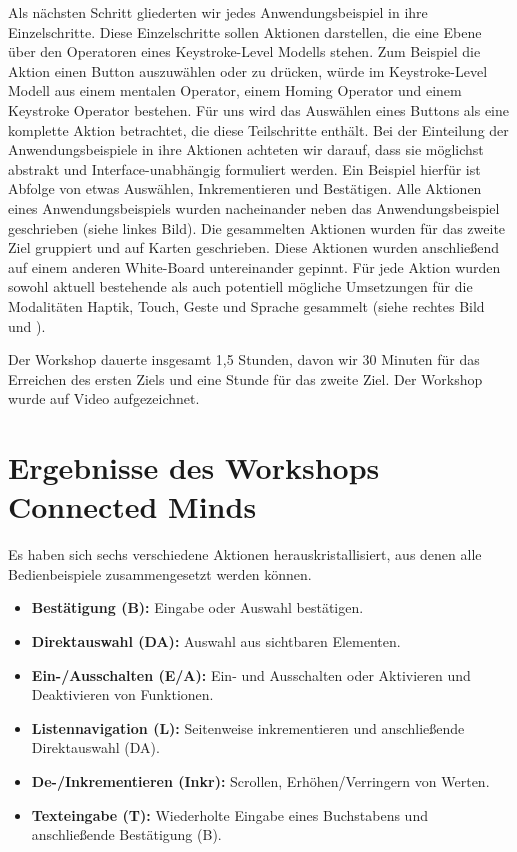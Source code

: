 Als nächsten Schritt gliederten wir jedes Anwendungsbeispiel in ihre Einzelschritte. 
Diese Einzelschritte sollen Aktionen darstellen, die eine Ebene über den Operatoren eines Keystroke-Level Modells stehen. 
Zum Beispiel die Aktion einen Button auszuwählen oder zu drücken, würde im Keystroke-Level Modell aus einem mentalen Operator, einem Homing Operator und einem Keystroke Operator bestehen. 
Für uns wird das Auswählen eines Buttons als eine komplette Aktion betrachtet, die diese Teilschritte enthält. 
Bei der Einteilung der Anwendungsbeispiele in ihre Aktionen achteten wir darauf, dass sie möglichst abstrakt und Interface-unabhängig formuliert werden. 
Ein Beispiel hierfür ist Abfolge von etwas Auswählen, Inkrementieren und Bestätigen. Alle Aktionen eines Anwendungsbeispiels wurden nacheinander neben das Anwendungsbeispiel geschrieben (siehe  linkes Bild). 
Die gesammelten Aktionen wurden für das zweite Ziel gruppiert und auf Karten geschrieben. Diese Aktionen wurden anschließend auf einem anderen White-Board untereinander gepinnt. 
Für jede Aktion wurden sowohl aktuell bestehende als auch potentiell mögliche Umsetzungen für die Modalitäten Haptik, Touch, Geste und Sprache gesammelt (siehe  rechtes Bild und ). 

Der Workshop dauerte insgesamt 1,5 Stunden, davon wir 30 Minuten für das Erreichen des ersten Ziels und eine Stunde für das zweite Ziel. 
Der Workshop wurde auf Video aufgezeichnet.
\section[Ergebnisse des Workshops]{Ergebnisse des Workshops Connected Minds}
Es haben sich sechs verschiedene Aktionen herauskristallisiert, aus denen alle Bedienbeispiele zusammengesetzt werden können.
\begin{itemize}
	\item \textbf{Bestätigung (B):} Eingabe oder Auswahl bestätigen.
	\item \textbf{Direktauswahl (DA):} Auswahl aus sichtbaren Elementen.
	\item \textbf{Ein-/Ausschalten (E/A):} Ein- und Ausschalten oder Aktivieren und Deaktivieren von Funktionen.
	\item \textbf{Listennavigation (L):} Seitenweise inkrementieren und anschließende Direktauswahl (DA).
	\item \textbf{De-/Inkrementieren (Inkr):}  Scrollen, Erhöhen/Verringern von Werten.
	\item \textbf{Texteingabe (T):}  Wiederholte Eingabe eines Buchstabens und anschließende Bestätigung (B).
\end{itemize}

